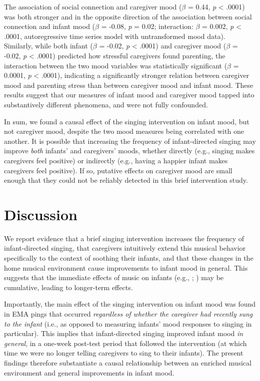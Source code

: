 \documentclass[
]{article}
\begin{document}
The association of social connection and caregiver mood (\(\beta\) =
0.44, \emph{p} \textless{} .0001) was both stronger and in the opposite
direction of the association between social connection and infant mood
(\(\beta\) = -0.08, \emph{p} = 0.02; interaction: \(\beta\) = 0.002,
\emph{p} \textless{} .0001, autoregressive time series model with
untransformed mood data). Similarly, while both infant (\(\beta\) =
-0.02, \emph{p} \textless{} .0001) and caregiver mood (\(\beta\) =
-0.02, \emph{p} \textless{} .0001) predicted how stressful caregivers
found parenting, the interaction between the two mood variables was
statistically significant (\(\beta\) = 0.0001, \emph{p} \textless{}
.0001), indicating a significantly stronger relation between caregiver
mood and parenting stress than between caregiver mood and infant mood.
These results suggest that our measures of infant mood and caregiver
mood tapped into substantively different phenomena, and were not fully
confounded.

In sum, we found a causal effect of the singing intervention on infant
mood, but not caregiver mood, despite the two mood measures being
correlated with one another. It is possible that increasing the
frequency of infant-directed singing may improve \emph{both} infants'
and caregivers' moods, whether directly (e.g., singing makes caregivers
feel positive) or indirectly (e.g., having a happier infant makes
caregivers feel positive). If so, putative effects on caregiver mood are
small enough that they could not be reliably detected in this brief
intervention study.

\section{Discussion}\label{discussion}

We report evidence that a brief singing intervention increases the
frequency of infant-directed singing, that caregivers intuitively extend
this musical behavior specifically to the context of soothing their
infants, and that these changes in the home musical environment cause
improvements to infant mood in general. This suggests that the immediate
effects of music on infants (e.g.,
;
) may be cumulative,
leading to longer-term effects.

Importantly, the main effect of the singing intervention on infant mood
was found in EMA pings that occurred \emph{regardless of whether the
caregiver had recently sung to the infant} (i.e., as opposed to
measuring infants' mood responses to singing in particular). This
implies that infant-directed singing improved infant mood \emph{in
general}, in a one-week post-test period that followed the intervention
(at which time we were no longer telling caregivers to sing to their
infants). The present findings therefore substantiate a causal
relationship between an enriched musical environment and general
improvements in infant mood.
\end{document}
